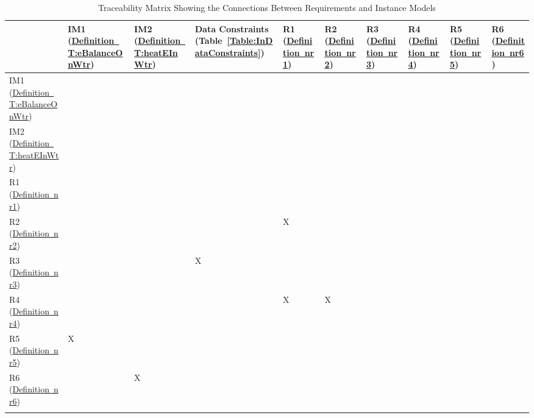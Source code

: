 \documentclass[12pt]{article}
\begin{document}
\begin{longtable}{l l l l l l l l l l}
\toprule
 & IM1 (\hyperref[T:eBalanceOnWtr]{Definition~T:eBalanceOnWtr}) & IM2 (\hyperref[T:heatEInWtr]{Definition~T:heatEInWtr}) & Data Constraints (Table~\ref{Table:InDataConstraints}) & R1 (\hyperref[nr1]{Definition~nr1}) & R2 (\hyperref[nr2]{Definition~nr2}) & R3 (\hyperref[nr3]{Definition~nr3}) & R4 (\hyperref[nr4]{Definition~nr4}) & R5 (\hyperref[nr5]{Definition~nr5}) & R6 (\hyperref[nr6]{Definition~nr6})
\\
\midrule
IM1 (\hyperref[T:eBalanceOnWtr]{Definition~T:eBalanceOnWtr}) &  &  &  &  &  &  &  &  & 
\\
IM2 (\hyperref[T:heatEInWtr]{Definition~T:heatEInWtr}) &  &  &  &  &  &  &  &  & 
\\
R1 (\hyperref[nr1]{Definition~nr1}) &  &  &  &  &  &  &  &  & 
\\
R2 (\hyperref[nr2]{Definition~nr2}) &  &  &  & X &  &  &  &  & 
\\
R3 (\hyperref[nr3]{Definition~nr3}) &  &  & X &  &  &  &  &  & 
\\
R4 (\hyperref[nr4]{Definition~nr4}) &  &  &  & X & X &  &  &  & 
\\
R5 (\hyperref[nr5]{Definition~nr5}) & X &  &  &  &  &  &  &  & 
\\
R6 (\hyperref[nr6]{Definition~nr6}) &  & X &  &  &  &  &  &  & 
\\
\bottomrule
\caption{Traceability Matrix Showing the Connections Between Requirements and Instance Models}
\label{Table:TraceyRIs}
\end{longtable}
\end{document}
